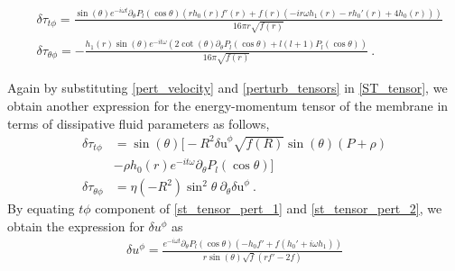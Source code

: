 \documentclass[aps,prd,twocolumn,floatfix,noshowpacs,tightenlines,noshowkeys,superscriptaddress,amsmath,amssymb,
nofootinbib]{revtex4-1}
\renewcommand\[{\begin{equation}}
\renewcommand\]{\end{equation}}
\begin{document}
\begin{widetext}
\begin{equation}\label{st_tensor_pert_1}
	\begin{aligned}
		&\delta \tau_{t\phi}=\frac{\sin (\theta ) e^{-i  \omega t} \partial_\theta P_l(\cos\theta ) \left(r h_0(r) f'(r)+f(r) \left(-i r \omega  h_1(r)-r h_0'(r)+4 h_0(r)\right)\right)}{16 \pi  r \sqrt{f(r)} }\\ 
		&\delta \tau_{\theta\phi}=-\frac{h_1(r) \sin (\theta ) e^{-i t \omega } \left(2 \cot (\theta )\partial_\theta P_l(\cos\theta )+l (l+1) P_l(\cos\theta )\right)}{16 \pi  \sqrt{f(r)}}~.
	\end{aligned}
\end{equation}
\end{widetext}
Again by substituting \autoref{pert_velocity} and \autoref{perturb_tensors} in \autoref{ST_tensor}, we obtain another expression for the energy-momentum tensor of the membrane in terms of dissipative fluid parameters as follows,
\begin{equation}\label{st_tensor_pert_2}
	\begin{aligned}
		\delta \tau_{t\phi}&=\sin (\theta ) \bigg[-R^2 \text{$\delta $u}^{\phi } \sqrt{f(R)} \sin (\theta ) (P+\rho )\\&-\rho  h_0(r) e^{-i t \omega } \partial_\theta P_l(\cos\theta )\bigg]\\ 
		\delta \tau_{\theta\phi}&=\eta  \left(-R^2\right) \sin ^2\theta ~ \partial_\theta\text{$\delta $u}^{\phi }~.
	\end{aligned}
\end{equation}
By equating $t\phi$ component of \autoref{st_tensor_pert_1} and \autoref{st_tensor_pert_2}, we obtain the expression for $\delta u^\phi$ as 
\begin{equation}\label{u_phi}
	\begin{aligned}
	\delta u^\phi=\frac{ e^{-i  \omega t } \partial_\theta P_l(\cos\theta ) \left(-h_0 f'+f \left(h_0'+i \omega  h_1\right)\right)}{r \sin (\theta )\sqrt{f} \left(r f'-2 f\right)}
	\end{aligned}
\end{equation}
\end{document}
